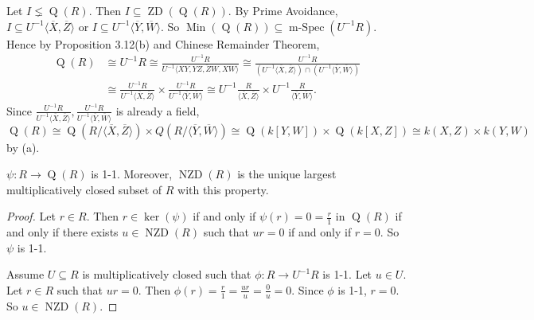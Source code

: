 \begin{example*}
\begin{enumerate}
            Let $I \lneq \operatorname{Q}(R)$. Then $I \subseteq \operatorname{ZD}(\operatorname{Q}(R))$. By Prime Avoidance, $I \subseteq U^{-1}\langle \overbar{X}, \overbar{Z} \rangle$ or $I \subseteq U^{-1} \langle \overbar{Y}, \overbar{W} \rangle$. So $ \operatorname{Min}(\operatorname{Q}(R)) \subseteq \operatorname{m-Spec}(U^{-1}R)$. Hence by Proposition 3.12(b) and Chinese Remainder Theorem,
            \begin{align*}
                \operatorname{Q}(R) &\cong U^{-1}R \cong \frac{U^{-1}R}{U^{-1}\langle \overbar{XY,YZ,ZW,XW} \rangle} \cong \frac{U^{-1}R}{(U^{-1}\langle \overbar{X},\overbar{Z} \rangle) \cap (U^{-1}\langle \overbar{Y},\overbar{W} \rangle)} \\
                &\cong \frac{U^{-1}R}{U^{-1} \langle \overbar{X}, \overbar{Z} \rangle} \times \frac{U^{-1}R}{U^{-1} \langle \overbar{Y}, \overbar{W} \rangle} \cong U^{-1}\frac{R}{\langle \overbar{X}, \overbar{Z} \rangle} \times U^{-1} \frac{R}{\langle \overbar{Y}, \overbar{W} \rangle}.
            \end{align*}
            Since $\frac{U^{-1}R}{U^{-1}\langle \overbar{X}, \overbar{Z}\rangle}, \frac{U^{-1}R}{U^{-1}\langle \overbar{Y}, \overbar{W} \rangle}$ is already a field, $\operatorname{Q}(R) \cong \operatorname{Q}(R/\langle \overbar{X}, \overbar{Z} \rangle) \times Q(R/\langle \overbar{Y}, \overbar{W} \rangle) \cong \operatorname{Q}(k[Y,W]) \times \operatorname{Q}(k[X,Z]) \cong k(X,Z) \times k(Y,W)$ by (a).
    \end{enumerate}
\end{example*}

\begin{proposition}
    $\psi: R \to \operatorname{Q}(R)$ is 1-1. Moreover, $\operatorname{NZD}(R)$ is the unique largest multiplicatively closed subset of $R$ with this property.
\end{proposition}

\begin{proof}
    Let $r \in R$. Then $r \in \ker(\psi)$ if and only if $\psi(r) = 0 = \frac{r}{1}$ in $\operatorname{Q}(R)$ if and only if there exists $u \in \operatorname{NZD}(R)$ such that $ur = 0$ if and only if $r = 0$. So $\psi$ is 1-1. \par
    Assume $U \subseteq R$ is multiplicatively closed such that $\phi: R \to U^{-1}R$ is 1-1. Let $u \in U$. Let $r \in R$ such that $ur = 0$. Then $\phi(r) = \frac{r}{1} = \frac{ur}{u} = \frac{0}{u} = 0$. Since $\phi$ is 1-1, $r = 0$. So $u \in \operatorname{NZD}(R)$.
\end{proof}

